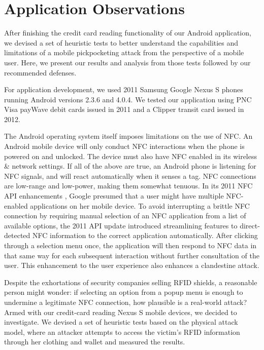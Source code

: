 \documentclass{sig-alternate}
\begin{document}
\section{Application Observations}
After finishing the credit card reading functionality of our Android application, we devised a set of heuristic tests to better understand the capabilities and limitations of a mobile pickpocketing attack from the perspective of a mobile user.  Here, we present our results and analysis from those tests followed by our recommended defenses.  

For application development, we used 2011 Samsung Google Nexus S phones running Android versions 2.3.6 and 4.0.4.  We tested our application using PNC Visa payWave debit cards issued in 2011 and a Clipper transit card issued in 2012.

The Android operating system itself imposes limitations on the use of NFC.  An Android mobile device will only conduct NFC interactions when the phone is powered on and unlocked.  The device must also have NFC enabled in its wireless 
\& network settings.  If all of the above are true, an Android phone is listening for NFC signals, and will react automatically when it senses a tag.  NFC connections are low-range and low-power, making them somewhat tenuous.  In its 2011 NFC API enhancements \cite{android-developers-nfc-basics}, Google presumed that a user might have multiple NFC-enabled applications on her mobile device.  To avoid interrupting a brittle NFC connection by requiring manual selection of an NFC application from a list of available options, the 2011 API update introduced streamlining features to direct-detected NFC information to the correct application automatically.  After clicking through a selection menu once, the application will then respond to NFC data in that same way for each subsequent interaction without further consultation of the user.  This enhancement to the user experience also enhances a clandestine attack.

Despite the exhortations of security companies selling RFID shields, a reasonable person might wonder:  if selecting an option from a popup menu is enough to undermine a legitimate NFC connection, how plausible is a real-world attack?  Armed with our credit-card reading Nexus S mobile devices, we decided to investigate.  We devised a set of heuristic tests based on the physical attack model, where an attacker attempts to access the victim's RFID information through her clothing and wallet and measured the results.  
\end{document}
